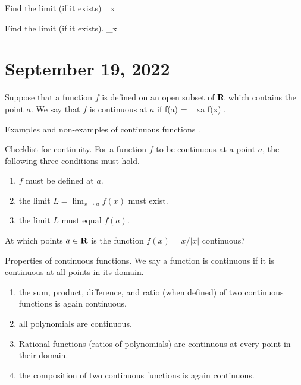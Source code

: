 \documentclass[11pt]{amsart}
\begin{document}
\begin{eg}
Find the limit (if it exists)
\beqn
\lim_{x \to \infty}
\eeqn
\end{eg}

\vspace{5cm}

\begin{eg}
Find the limit (if it exists). 
\beqn
\lim_{x \to \infty} 
\eeqn
\end{eg}

\newpage

\section*{September 19, 2022}

\begin{dfn}
Suppose that a function $f$ is defined on an open subset of $\mathbf{R}$ which contains the point $a$. 
We say that $f$ is continuous at $a$ if 
\beqn
f(a) = \lim_{x\to a} f(x) .
\eeqn
\end{dfn}

\parsec
Examples and non-examples of continuous functions .

\parsec 
Checklist for continuity.
For a function $f$ to be continuous at a point $a$, the following three conditions must hold.
\begin{enumerate}
\item $f$ must be defined at $a$.
\item the limit $L = \lim_{x \to a} f(x)$ must exist.
\item the limit $L$ must equal $f(a)$. 
\end{enumerate}

\begin{eg}
At which points $a \in \mathbf{R}$ is the function $f(x) = x / |x|$ continuous?
\end{eg}

\parsec
Properties of continuous functions. 
We say a function is continuous if it is continuous at all points in its domain. 
\begin{enumerate}
\item the sum, product, difference, and ratio (when defined) of two continuous functions is again continuous. 
\item all polynomials are continuous. 
\item Rational functions (ratios of polynomials) are continuous at every point in their domain. 
\item the composition of two continuous functions is again continuous. 
\end{enumerate}
\end{document}

